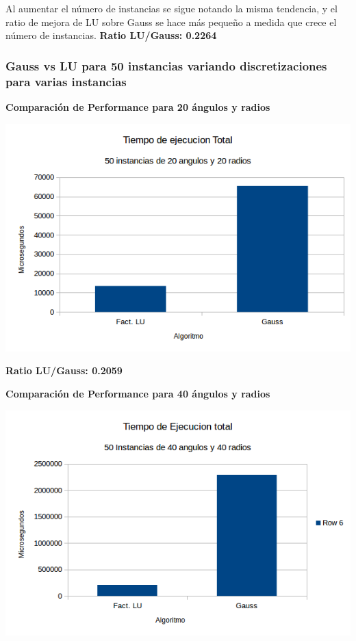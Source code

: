 Al aumentar el n\'umero de instancias se sigue notando la misma tendencia, y el ratio de mejora de LU sobre Gauss se hace m\'as pequeño a medida que crece el n\'umero de instancias. \textbf{Ratio LU/Gauss: 0.2264}

\subsubsection{Gauss vs LU para 50 instancias variando discretizaciones para varias instancias}

  	\textbf{Comparaci\'on de Performance para 20 \'angulos y radios }\\
\begin{center}
\includegraphics[scale=0.7]{experimentos2a_2b/2b2020.png}
\end{center}

 \textbf{Ratio LU/Gauss: 0.2059}

  	\textbf{Comparaci\'on de Performance para 40 \'angulos y radios }\\
\begin{center}
\includegraphics[scale=0.7]{experimentos2a_2b/2b4040.png}
\end{center}

